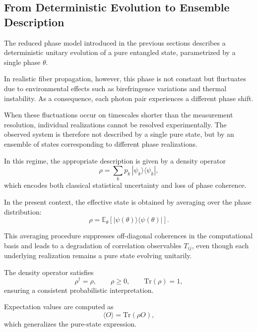 \documentclass[a4paper]{article}
\begin{document}

\subsection{From Deterministic Evolution to Ensemble Description}

The reduced phase model introduced in the previous sections describes a deterministic unitary evolution of a pure entangled state, parametrized by a single phase \( \theta \).

In realistic fiber propagation, however, this phase is not constant but fluctuates due to environmental effects such as birefringence variations and thermal instability. As a consequence, each photon pair experiences a different phase shift.

\medskip

When these fluctuations occur on timescales shorter than the measurement resolution, individual realizations cannot be resolved experimentally. The observed system is therefore not described by a single pure state, but by an ensemble of states corresponding to different phase realizations.

\medskip

In this regime, the appropriate description is given by a density operator
\[
\rho = \sum_k p_k \, |\psi_k\rangle \langle \psi_k|,
\]
which encodes both classical statistical uncertainty and loss of phase coherence.

\medskip

In the present context, the effective state is obtained by averaging over the phase distribution:
\[
\rho = \mathbb{E}_{\theta}\!\left[ |\psi(\theta)\rangle \langle \psi(\theta)| \right].
\]

\medskip

This averaging procedure suppresses off-diagonal coherences in the computational basis and leads to a degradation of correlation observables \( T_{ij} \), even though each underlying realization remains a pure state evolving unitarily.

\medskip

The density operator satisfies
\[
\rho^\dagger = \rho,
\qquad
\rho \ge 0,
\qquad
\mathrm{Tr}(\rho) = 1,
\]
ensuring a consistent probabilistic interpretation.

\medskip

Expectation values are computed as
\[
\langle O \rangle = \mathrm{Tr}(\rho O),
\]
which generalizes the pure-state expression.
\end{document}
